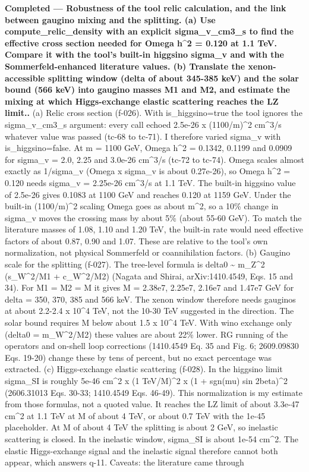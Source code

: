 \documentclass[11pt,a4paper]{article}
\begin{document}
\textbf{Completed --- Robustness of the tool relic calculation, and the link between gaugino mixing and the splitting. (a) Use compute\_relic\_density with an explicit sigma\_v\_cm3\_s to find the effective cross section needed for Omega h\textasciicircum{}2 = 0.120 at 1.1 TeV. Compare it with the tool's built-in higgsino sigma\_v and with the Sommerfeld-enhanced literature values. (b) Translate the xenon-accessible splitting window (delta of about 345-385 keV) and the solar bound (566 keV) into gaugino masses M1 and M2, and estimate the mixing at which Higgs-exchange elastic scattering reaches the LZ limit..} (a) Relic cross section (f-026). With is\_higgsino=true the tool ignores the sigma\_v\_cm3\_s argument: every call echoed 2.5e-26 x (1100/m)\textasciicircum{}2 cm\textasciicircum{}3/s whatever value was passed (tc-68 to tc-71). I therefore varied sigma\_v with is\_higgsino=false. At m = 1100 GeV, Omega h\textasciicircum{}2 = 0.1342, 0.1199 and 0.0909 for sigma\_v = 2.0, 2.25 and 3.0e-26 cm\textasciicircum{}3/s (tc-72 to tc-74). Omega scales almost exactly as 1/sigma\_v (Omega x sigma\_v is about 0.27e-26), so Omega h\textasciicircum{}2 = 0.120 needs sigma\_v = 2.25e-26 cm\textasciicircum{}3/s at 1.1 TeV. The built-in higgsino value of 2.5e-26 gives 0.1083 at 1100 GeV and reaches 0.120 at 1159 GeV. Under the built-in (1100/m)\textasciicircum{}2 scaling Omega goes as about m\textasciicircum{}2, so a 10\% change in sigma\_v moves the crossing mass by about 5\% (about 55-60 GeV). To match the literature masses of 1.08, 1.10 and 1.20 TeV, the built-in rate would need effective factors of about 0.87, 0.90 and 1.07. These are relative to the tool's own normalization, not physical Sommerfeld or coannihilation factors. (b) Gaugino scale for the splitting (f-027). The tree-level formula is delta0 \textasciitilde{} m\_Z\textasciicircum{}2 (s\_W\textasciicircum{}2/M1 + c\_W\textasciicircum{}2/M2) (Nagata and Shirai, arXiv:1410.4549, Eqs. 15 and 34). For M1 = M2 = M it gives M = 2.38e7, 2.25e7, 2.16e7 and 1.47e7 GeV for delta = 350, 370, 385 and 566 keV. The xenon window therefore needs gauginos at about 2.2-2.4 x 10\textasciicircum{}4 TeV, not the 10-30 TeV suggested in the direction. The solar bound requires M below about 1.5 x 10\textasciicircum{}4 TeV. With wino exchange only (delta0 = m\_W\textasciicircum{}2/M2) these values are about 22\% lower. RG running of the operators and on-shell loop corrections (1410.4549 Eq. 35 and Fig. 6; 2609.09830 Eqs. 19-20) change these by tens of percent, but no exact percentage was extracted. (c) Higgs-exchange elastic scattering (f-028). In the higgsino limit sigma\_SI is roughly 5e-46 cm\textasciicircum{}2 x (1 TeV/M)\textasciicircum{}2 x (1 + sgn(mu) sin 2beta)\textasciicircum{}2 (2606.31013 Eqs. 30-33; 1410.4549 Eqs. 46-49). This normalization is my estimate from those formulas, not a quoted value. It reaches the LZ limit of about 3.3e-47 cm\textasciicircum{}2 at 1.1 TeV at M of about 4 TeV, or about 0.7 TeV with the 1e-45 placeholder. At M of about 4 TeV the splitting is about 2 GeV, so inelastic scattering is closed. In the inelastic window, sigma\_SI is about 1e-54 cm\textasciicircum{}2. The elastic Higgs-exchange signal and the inelastic signal therefore cannot both appear, which answers q-11. Caveats: the literature came through 
\end{document}

